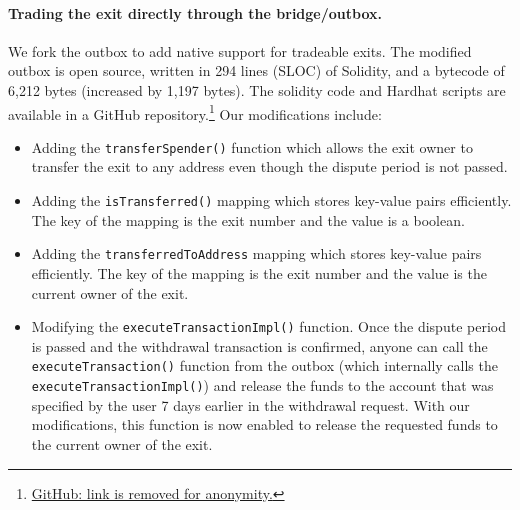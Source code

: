 \paragraph{Trading the exit directly through the bridge/outbox.} We fork the \arb \nitro outbox to add native support for tradeable exits. The modified outbox is open source, written in 294 lines (SLOC) of Solidity, and a bytecode of 6,212 bytes (increased by 1,197 bytes). The solidity code and Hardhat scripts are available in a GitHub repository.\footnote{\href{https://}{GitHub: link is removed for anonymity.}} Our modifications include:

\begin{itemize}
\item Adding the \texttt{transferSpender()} function which allows the exit owner to transfer the exit to any \layerone address even though the dispute period is not passed.
\item Adding the \texttt{isTransferred()} mapping which stores key-value pairs efficiently. The key of the mapping is the exit number and the value is a boolean.
\item Adding the \texttt{transferredToAddress} mapping which stores key-value pairs efficiently. The key of the mapping is the exit number and the value is the current owner of the exit.
\item Modifying the \texttt{executeTransactionImpl()} function. Once the dispute period is passed and the withdrawal transaction is confirmed, anyone can call the \texttt{executeTransaction()} function from the outbox (which internally calls the \texttt{executeTransactionImpl()}) and release the funds to the account that was specified by the user 7 days earlier in the \layertwo withdrawal request. With our modifications, this function is now enabled to release the requested funds to the current owner of the exit.
 \end{itemize}
 
